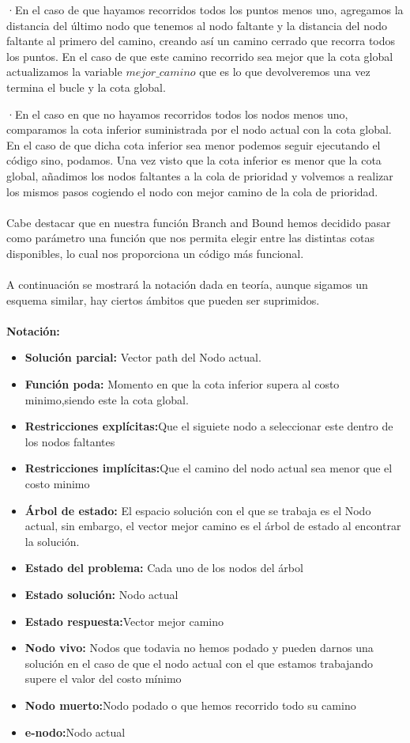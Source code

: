 \documentclass[11pt,openany]{book}
\begin{document}
·En el caso de que hayamos recorridos todos los puntos menos uno, agregamos la distancia del último nodo que tenemos al nodo faltante 
y la distancia del nodo faltante al primero del camino, creando así un camino cerrado que recorra todos los puntos. En el caso de que este camino
recorrido sea mejor que la cota global actualizamos la variable $mejor\_camino$ que es lo que devolveremos una vez termina el bucle y la cota global.

·En el caso en que no hayamos recorridos todos los nodos menos uno, comparamos la cota inferior suministrada por el nodo actual con la cota global. En el caso
de que dicha cota inferior sea menor podemos seguir ejecutando el código sino, podamos. Una vez visto que la cota inferior es menor que la cota global, añadimos 
los nodos faltantes a la cola de prioridad y volvemos a realizar los mismos pasos cogiendo el nodo con mejor camino de la cola de prioridad. 
\\ \\
Cabe destacar que en nuestra función Branch and Bound hemos decidido pasar como parámetro una función que nos permita elegir entre las distintas cotas
disponibles, lo cual nos proporciona un código más funcional.
\\\\
A continuación se mostrará la notación dada en teoría, aunque sigamos un esquema similar, hay ciertos ámbitos que pueden ser suprimidos.
\\\\
\textbf{Notación:}
\begin{itemize}
      \item \textbf{Solución parcial:} Vector path del Nodo actual.
      \item \textbf{Función poda:} Momento en que la cota inferior supera al costo minimo,siendo este la cota global.
      \item \textbf{Restricciones explícitas:}Que el siguiete nodo a seleccionar este dentro de los nodos faltantes
      \item \textbf{Restricciones implícitas:}Que el camino del nodo actual sea menor que el costo minimo
      \item \textbf{Árbol de estado:} El espacio solución con el que se trabaja es el Nodo actual, sin embargo, el 
      vector mejor camino es el árbol de estado al encontrar la solución.
      \item \textbf{Estado del problema:} Cada uno de los nodos del árbol
      \item \textbf{Estado solución:} Nodo actual
      \item \textbf{Estado respuesta:}Vector mejor camino
      \item \textbf{Nodo vivo:} Nodos que todavia no hemos podado y pueden darnos una solución en el caso de que el nodo actual con el que
      estamos trabajando supere el valor del costo mínimo 
      \item \textbf{Nodo muerto:}Nodo podado o que hemos recorrido todo su camino
      \item \textbf{e-nodo:}Nodo actual
\end{itemize}
\end{document}
